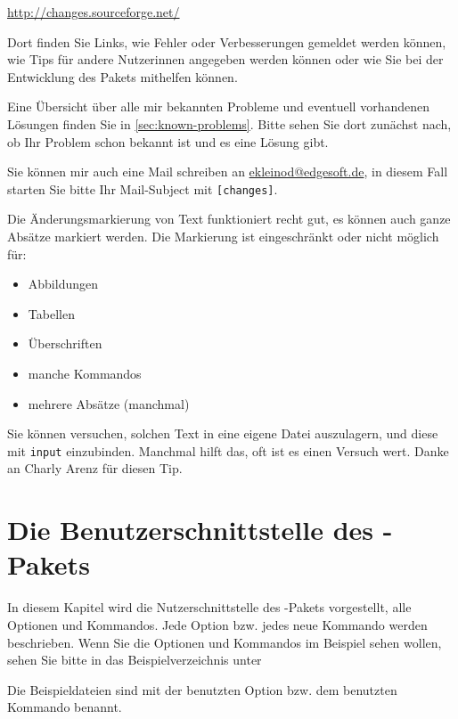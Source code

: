 \url{http://changes.sourceforge.net/}

Dort finden Sie Links, wie Fehler oder Verbesserungen gemeldet werden können, wie Tips für andere Nutzerinnen angegeben werden können oder wie Sie bei der Entwicklung des Pakets mithelfen können.

Eine Übersicht über alle mir bekannten Probleme und eventuell vorhandenen Lösungen finden Sie in \autoref{sec:known-problems}.
Bitte sehen Sie dort zunächst nach, ob Ihr Problem schon bekannt ist und es eine Lösung gibt.

Sie können mir auch eine Mail schreiben an \href{mailto:ekleinod@edgesoft.de}{ekleinod@edgesoft.de}, in diesem Fall starten Sie bitte Ihr Mail-Subject mit \texttt{[changes]}.

Die Änderungsmarkierung von Text funktioniert recht gut, es können auch ganze Absätze markiert werden.
Die Markierung ist eingeschränkt oder nicht möglich für:

\begin{itemize}
	\item Abbildungen
	\item Tabellen
	\item Überschriften
	\item manche Kommandos
	\item mehrere Absätze (manchmal)
\end{itemize}

Sie können versuchen, solchen Text in eine eigene Datei auszulagern, und diese mit \texttt{input} einzubinden.
Manchmal hilft das, oft ist es einen Versuch wert.
Danke an Charly Arenz für diesen Tip.



\cleardoublepage
\section{Die Benutzerschnittstelle des -Pakets}
\label{sec:ui}

In diesem Kapitel wird die Nutzerschnittstelle des -Pakets vorgestellt, \dh alle Optionen und Kommandos.
Jede Option bzw. jedes neue Kommando werden beschrieben.
Wenn Sie die Optionen und Kommandos im Beispiel sehen wollen, sehen Sie bitte in das Beispielverzeichnis unter


Die Beispieldateien sind mit der benutzten Option bzw. dem benutzten Kommando benannt.

